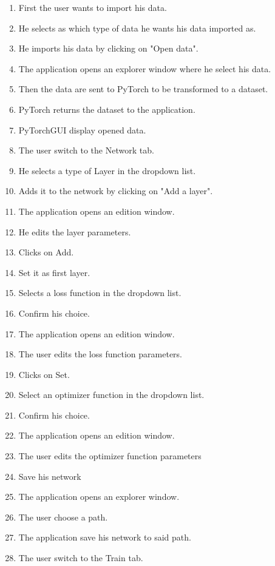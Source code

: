     
    \begin{enumerate}
        \item First the user wants to import his data.
        \item He selects as which type of data he wants his data imported as.
        \item He imports his data by clicking on "Open data".
        \item The application opens an explorer window where he select his data.
        \item Then the data are sent to PyTorch to be transformed to a dataset.
        \item PyTorch returns the dataset to the application.
        \item PyTorchGUI display opened data.
        \item The user switch to the Network tab.
        \item He selects a type of Layer in the dropdown list.
        \item Adds it to the network by clicking on "Add a layer".
        \item The application opens an edition window.
        \item He edits the layer parameters.
        \item Clicks on Add.
        \item Set it as first layer.
        \item Selects a loss function in the dropdown list.
        \item Confirm his choice.
        \item The application opens an edition window.
        \item The user edits the loss function parameters.
        \item Clicks on Set.
        \item Select an optimizer function in the dropdown list.
        \item Confirm his choice.
        \item The application opens an edition window.
        \item The user edits the optimizer function parameters
        \item Save his network
        \item The application opens an explorer window.
        \item The user choose a path.
        \item The application save his network to said path.
        \item The user switch to the Train tab.

\end{enumerate}
